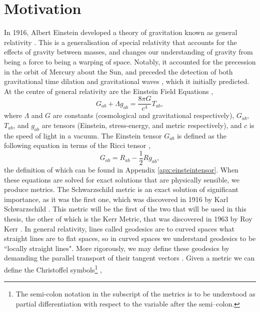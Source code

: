 \section{Motivation}\label{sec:motivation}

In 1916, Albert Einstein developed a theory of gravitation known as general relativity \cite{einsteinGR}.
This is a generalisation of special relativity that accounts for the effects of gravity between masses, and changes our understanding of gravity from being a force to being a warping of space.
Notably, it accounted for the precession in the orbit of Mercury about the Sun, and preceded the detection of both gravitational time dilation \cite{gravTimeDilateDetect} and gravitational waves \cite{gravWaveDetectPaper}, which it initially predicted.
At the centre of general relativity are the Einstein Field Equations \cite{einsteinFieldEquations},
\begin{equation}
G_{ab}+\Lambda g_{ab}=\frac{8\pi G}{c^4}T_{ab},
\end{equation}
where $\Lambda$ and $G$ are constants (cosmological and gravitational respectively), $G_{ab}$, $T_{ab}$, and $g_{ab}$ are tensors (Einstein, stress-energy, and metric respectively), and $c$ is the speed of light in a vacuum.
The Einstein tensor $G_{ab}$ is defined as the following equation in terms of the Ricci tensor \cite{einsteinFieldEquations},
\begin{equation}
G_{ab}=R_{ab}-\frac{1}{2}Rg_{ab},
\end{equation}
the definition of which can be found in Appendix \ref{apx:einsteintensor}.
When these equations are solved for exact solutions that are physically sensible, we produce metrics.
The Schwarzschild metric is an exact solution of significant importance, as it was the first one, which was discovered in 1916 by Karl Schwarzschild \cite{schwarz1916}.
This metric will be the first of the two that will be used in this thesis, the other of which is the Kerr Metric, that was discovered in 1963 by Roy Kerr \cite{kerrMetric}.
In general relativity, lines called geodesics are to curved spaces what straight lines are to flat spaces, so in curved spaces we understand geodesics to be ``locally straight lines". More rigorously, we may define these geodesics by demanding the parallel transport of their tangent vectors \cite{schutzFirstGR}.
Given a metric we can define the Christoffel symbols\footnote{The semi-colon notation in the subscript of the metrics is to be understood as partial differentiation with respect to the variable after the semi--colon.} \cite{einsteinFieldEquations},
